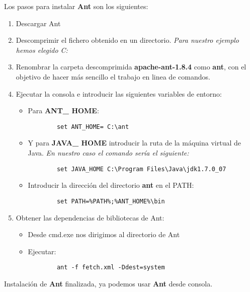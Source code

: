 Los pasos para instalar {\bf Ant} son los siguientes:

\begin{enumerate}
	\item Descargar Ant
	\item Descomprimir el fichero obtenido en un directorio. {\em Para nuestro ejemplo hemos elegido C:}
	\item Renombrar la carpeta descomprimida {\bf apache-ant-1.8.4} como {\bf ant}, con el objetivo de hacer más sencillo el trabajo en linea de comandos.
	\item Ejecutar la consola e introducir las siguientes variables de entorno:


	\begin{itemize}
		\item Para {\bf \small ANT\_ HOME}:
		\begin{lstlisting}
		set ANT_HOME= C:\ant
		\end{lstlisting}

		\item Y para {\bf \small JAVA\_ HOME} introducir la ruta de la máquina virtual de Java. {\em En nuestro caso el comando sería el siguiente:}
		\begin{lstlisting}
		set JAVA_HOME C:\Program Files\Java\jdk1.7.0_07
		\end{lstlisting}

		\item Introducir la dirección del directorio {\bf ant} en el PATH:
		\begin{lstlisting}
		set PATH=%PATH%;%ANT_HOME%\bin
		\end{lstlisting}
	\end{itemize}
	
	\item Obtener las dependencias de bibliotecas de Ant:
	
	\begin{itemize}
		\item Desde cmd.exe nos dirigimos al directorio de Ant
		\item Ejecutar:  
		\begin{lstlisting}
		ant -f fetch.xml -Ddest=system
		\end{lstlisting}
	\end{itemize}
\end{enumerate}

Instalación de {\bf Ant} finalizada, ya podemos usar {\bf Ant} desde consola.